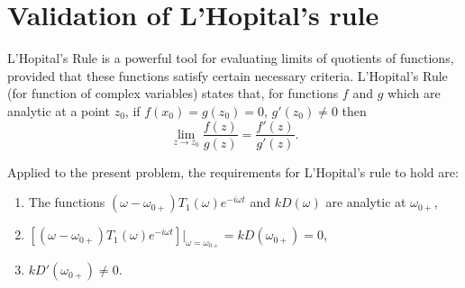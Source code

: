 \chapter{Validation of L'Hopital's rule} \label{app: l'hopital}
L'Hopital's Rule is a powerful tool for evaluating limits of quotients of functions, provided that these functions satisfy certain necessary criteria. L'Hopital's Rule (for function of complex variables) states that, for functions $f$ and $g$ which are analytic at a point $z_0$, if $f(x_0) = g(z_0) = 0$, $g'(z_0) \neq 0$ then
\begin{equation}
\lim_{z \to z_0}\frac{f(z)}{g(z)} = \frac{f'(z)}{g'(z)}.
\end{equation}

Applied to the present problem, the requirements for L'Hopital's rule to hold are:
\begin{enumerate}
	\item The functions $(\omega - \omega_{0+}) T_1(\omega) e^{-i\omega t}$ and $kD(\omega)$ are analytic at $\omega_{0+}$,
	\item $[(\omega - \omega_{0+}) T_1(\omega) e^{-i\omega t}]|_{\omega = \omega_{0+}} = kD(\omega_{0+}) = 0$,
	\item $kD'(\omega_{0+}) \neq 0$.
\end{enumerate}

